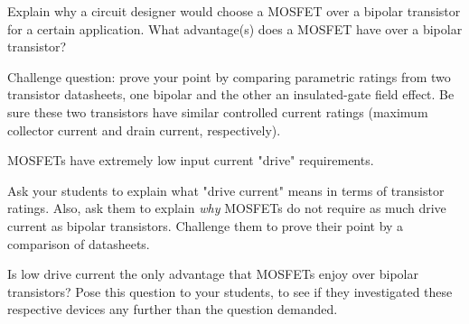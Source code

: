 

Explain why a circuit designer would choose a MOSFET over a bipolar transistor for a certain application.  What advantage(s) does a MOSFET have over a bipolar transistor?

\vskip 10pt

Challenge question: prove your point by comparing parametric ratings from two transistor datasheets, one bipolar and the other an insulated-gate field effect.  Be sure these two transistors have similar controlled current ratings (maximum collector current and drain current, respectively).







MOSFETs have extremely low input current "drive" requirements.







Ask your students to explain what "drive current" means in terms of transistor ratings.  Also, ask them to explain {\it why} MOSFETs do not require as much drive current as bipolar transistors.  Challenge them to prove their point by a comparison of datasheets.

Is low drive current the only advantage that MOSFETs enjoy over bipolar transistors?  Pose this question to your students, to see if they investigated these respective devices any further than the question demanded.



